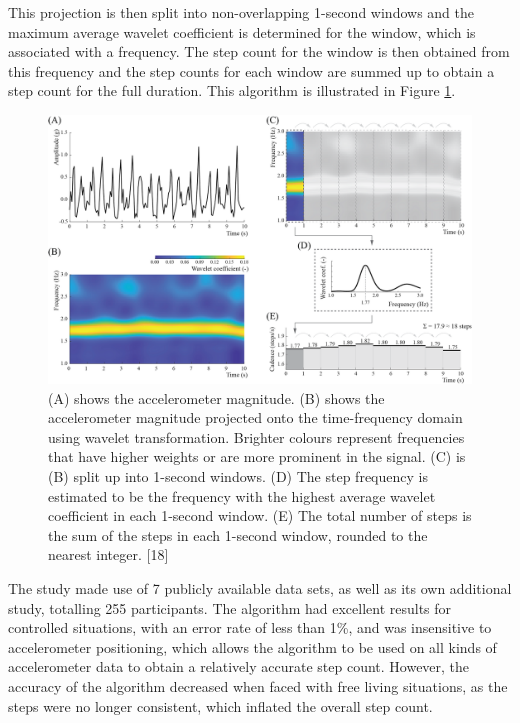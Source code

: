 \documentclass[12pt]{report}
\makeatletter
\newcommand{\cslcitation}[2]
 {\protect\hyper@linkstart{cite}{citeproc_bib_item_#1}#2\hyper@linkend}
\makeatother
\begin{document}
This projection is then split into non-overlapping
1-second windows and the maximum average wavelet coefficient
is determined for the window, which is associated with a frequency.
The step count for the window is then obtained from this frequency
and the step counts for each window are summed up to obtain a step
count for the full duration.
This algorithm is illustrated in Figure \ref{fig:org155de56}.

\begin{figure}[htbp]
\centering
\includegraphics[width=.9\linewidth]{./images/straczkiewicz-wavelet-transform.png}
\caption{\label{fig:org155de56}(A) shows the accelerometer magnitude. (B) shows the accelerometer magnitude projected onto the time-frequency domain using wavelet transformation. Brighter colours represent frequencies that have higher weights or are more prominent in the signal. (C) is (B) split up into 1-second windows. (D) The step frequency is estimated to be the frequency with the highest average wavelet coefficient in each 1-second window. (E) The total number of steps is the sum of the steps in each 1-second window, rounded to the nearest integer. \cslcitation{18}{[18]}}
\end{figure}

The study made use of 7 publicly available data sets, as well as
its own additional study, totalling 255 participants.
The algorithm had excellent results for controlled situations,
with an error rate of less than 1\%, and was insensitive to
accelerometer positioning, which allows the algorithm to be
used on all kinds of accelerometer data to obtain a relatively
accurate step count.
However, the accuracy of the algorithm decreased when faced
with free living situations, as the steps were no longer consistent,
which inflated the overall step count.
\end{document}
